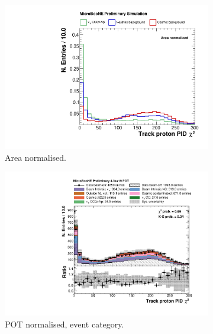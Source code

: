 \begin{figure}[htbp]
\centering
  \begin{subfigure}{0.49\textwidth}
    \includegraphics[width=\linewidth]{figures/h_track_pidchipr_norm.pdf}
    \caption{Area normalised.} \label{fig:proton_norm}
  \end{subfigure}
    \begin{subfigure}{0.49\textwidth}
    \includegraphics[width=\linewidth]{figures/h_track_pidchipr.pdf}
    \caption{POT normalised, event category.} \label{fig:proton_pot}
  \end{subfigure}
  \begin{subfigure}{0.49\textwidth}

\end{subfigure}
\end{figure}
